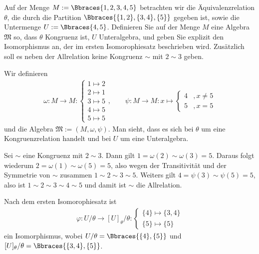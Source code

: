 \begin{exercise}
    Auf der Menge $M := \Bbraces{1, 2, 3, 4, 5}$ betrachten wir die Äquivalenzrelation $\theta$, die durch die Partition $\Bbraces{\{1, 2\}, \{3, 4\}, \{5\}}$ gegeben ist, sowie die Untermenge $U := \Bbraces{4, 5}$. Definieren Sie auf der Menge $M$ eine Algebra $\mathfrak{M}$ so, dass $\theta$ Kongruenz ist, $U$ Unteralgebra, und geben Sie explizit den Isomorphismus an, der im ersten Isomorophiesatz beschrieben wird. Zusätzlich soll es neben der Allrelation keine Kongruenz $\sim$ mit $2 \sim 3$ geben.
\end{exercise}

\begin{solution}
    Wir definieren
    \begin{align*}
        \omega: M \to M : 
        \begin{cases}
            1 \mapsto 2 \\
            2 \mapsto 1 \\
            3 \mapsto 5 \\
            4 \mapsto 5 \\
            5 \mapsto 5
        \end{cases}
        , \qquad \psi: M \to M: x \mapsto
        \begin{cases}
            4 &, x \neq 5 \\
            5 &, x = 5
        \end{cases}  
    \end{align*}
    und die Algebra $\mathfrak{M} := (M, \omega, \psi)$. Man sieht, dass es sich bei $\theta$ um eine Kongruenzrelation handelt und bei $U$ um eine Unteralgebra.
    
    Sei $\sim$ eine Kongruenz mit $2 \sim 3$. Dann gilt $ 1 = \omega(2) \sim \omega(3) = 5$. Daraus folgt wiederum $2 = \omega(1) \sim \omega(5) = 5$, also wegen der Transitivität und der Symmetrie von $\sim$ zusammen $1 \sim 2 \sim 3 \sim 5$. Weiters gilt $4 = \psi(3) \sim \psi(5) = 5$, also ist $1 \sim 2 \sim 3 \sim 4 \sim 5$ und damit ist $\sim$ die Allrelation.

    Nach dem ersten Isomorophiesatz ist
    \begin{align*}
        \varphi: U/\theta \to [U]_\theta/\theta: 
        \begin{cases}
            \{4\} \mapsto \{3, 4\} \\
            \{5\} \mapsto \{5\}
        \end{cases}
    \end{align*}
    ein Isomorphismus, wobei $U/\theta = \Bbraces{\{4\}, \{5\}}$ und $[U]_\theta/\theta = \Bbraces{\{3, 4\}, \{5\}}$.
\end{solution}